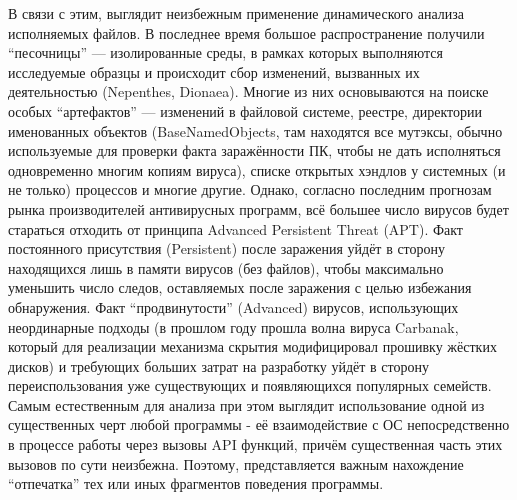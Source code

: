 В связи с этим, выглядит неизбежным применение динамического анализа исполняемых файлов. В последнее время большое распространение получили ``песочницы'' --- изолированные среды, в рамках которых выполняются исследуемые образцы и происходит сбор изменений, вызванных их деятельностью (Nepenthes, Dionaea). Многие из них основываются на поиске особых ``артефактов'' --- изменений в файловой системе, реестре, директории именованных объектов (BaseNamedObjects, там находятся все мутэксы, обычно используемые для проверки факта заражённости ПК, чтобы не дать исполняться одновременно многим копиям вируса), списке открытых хэндлов у системных (и не только) процессов и многие другие. Однако, согласно последним прогнозам рынка производителей антивирусных программ\cite{KASPERKSYBULLETIN}, всё большее число вирусов будет стараться отходить от принципа Advanced Persistent Threat (APT). Факт постоянного присутствия (Persistent) после заражения уйдёт в сторону находящихся лишь в памяти вирусов (без файлов), чтобы максимально уменьшить число следов, оставляемых после заражения с целью избежания обнаружения. Факт ``продвинутости'' (Advanced) вирусов, использующих неординарные подходы (в прошлом году прошла волна вируса Carbanak\cite{CARBANAK}, который для реализации механизма скрытия модифицировал прошивку жёстких дисков) и требующих больших затрат на разработку уйдёт в сторону переиспользования уже существующих и появляющихся популярных семейств. Самым естественным для анализа при этом выглядит использование одной из существенных черт любой программы - её взаимодействие с ОС непосредственно в процессе работы через вызовы API функций, причём существенная часть этих вызовов по сути неизбежна. Поэтому, представляется важным нахождение ``отпечатка'' тех или иных фрагментов поведения программы.